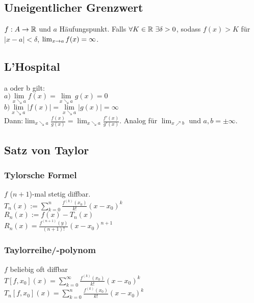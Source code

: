\subsection*{Uneigentlicher Grenzwert}
$f:A \rightarrow \mathbb R$ und $a$ Häufungspunkt. Falls $\forall K \in \R \ \exists \delta > 0$, sodass $f(x) > K$ für $|x - a| < \delta$, $\lim_{x \rightarrow a}f(x) = \infty$.
\subsection*{L'Hospital}
a oder b gilt:\\
    $a) \lim\limits_{x \searrow a} f(x) = \lim\limits_{x \searrow a} g(x)= 0$\\
    $b) \lim\limits_{x \searrow a} |f(x)| = \lim\limits_{x \searrow a} |g(x)| = \infty$\\
Dann:$\lim_{x\searrow a} \frac{f(x)}{g(x)} = \lim_{x \searrow a} \frac{f'(x)}{g'(x)}$. Analog für $\lim_{x \nearrow b}$ und $a, b = \pm \infty$.
\subsection*{Satz von Taylor}
\subsubsection*{Tylorsche Formel}
$f$
($n + 1$)-mal stetig diffbar.\\
$T_n(x) := \sum_{k = 0}^n \frac{f^{(k)}(x_0)}{k!}(x - x_0)^k$\\ %
$R_n(x) := f(x) - T_n(x)$\\%
$R_n(x) = \frac{f^{(n+1)}(y)}{(n+1)!}(x - x_0)^{n+1}$
\subsubsection*{Taylorreihe/-polynom}
$f$
beliebig oft diffbar\\
$T[f, x_0](x) = \sum\limits_{k = 0}^\infty \frac{f^{(k)}(x_0)}{k!} (x - x_0)^k$ 
$T_n[f, x_0](x) = \sum\limits_{k = 0}^n \frac{f^{(k)}(x_0)}{k!} (x - x_0)^k$
